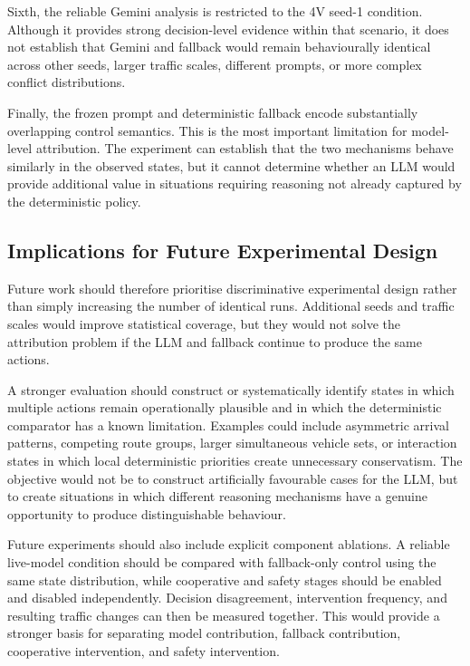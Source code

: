 \documentclass[letterpaper,10pt,conference]{ieeeconf}
\begin{document}
Sixth, the reliable Gemini analysis is restricted to the 4V seed-1 condition. Although it provides strong decision-level evidence within that scenario, it does not establish that Gemini and fallback would remain behaviourally identical across other seeds, larger traffic scales, different prompts, or more complex conflict distributions.



Finally, the frozen prompt and deterministic fallback encode substantially overlapping control semantics. This is the most important limitation for model-level attribution. The experiment can establish that the two mechanisms behave similarly in the observed states, but it cannot determine whether an LLM would provide additional value in situations requiring reasoning not already captured by the deterministic policy.



\subsection{Implications for Future Experimental Design}



Future work should therefore prioritise discriminative experimental design rather than simply increasing the number of identical runs. Additional seeds and traffic scales would improve statistical coverage, but they would not solve the attribution problem if the LLM and fallback continue to produce the same actions.



A stronger evaluation should construct or systematically identify states in which multiple actions remain operationally plausible and in which the deterministic comparator has a known limitation. Examples could include asymmetric arrival patterns, competing route groups, larger simultaneous vehicle sets, or interaction states in which local deterministic priorities create unnecessary conservatism. The objective would not be to construct artificially favourable cases for the LLM, but to create situations in which different reasoning mechanisms have a genuine opportunity to produce distinguishable behaviour.



Future experiments should also include explicit component ablations. A reliable live-model condition should be compared with fallback-only control using the same state distribution, while cooperative and safety stages should be enabled and disabled independently. Decision disagreement, intervention frequency, and resulting traffic changes can then be measured together. This would provide a stronger basis for separating model contribution, fallback contribution, cooperative intervention, and safety intervention.
\end{document}
